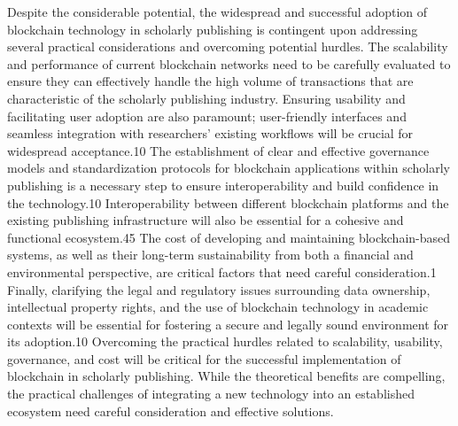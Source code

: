 Despite the considerable potential, the widespread and successful adoption of blockchain technology in scholarly publishing is contingent upon addressing several practical considerations and overcoming potential hurdles. The scalability and performance of current blockchain networks need to be carefully evaluated to ensure they can effectively handle the high volume of transactions that are characteristic of the scholarly publishing industry. Ensuring usability and facilitating user adoption are also paramount; user-friendly interfaces and seamless integration with researchers' existing workflows will be crucial for widespread acceptance.10 The establishment of clear and effective governance models and standardization protocols for blockchain applications within scholarly publishing is a necessary step to ensure interoperability and build confidence in the technology.10 Interoperability between different blockchain platforms and the existing publishing infrastructure will also be essential for a cohesive and functional ecosystem.45 The cost of developing and maintaining blockchain-based systems, as well as their long-term sustainability from both a financial and environmental perspective, are critical factors that need careful consideration.1 Finally, clarifying the legal and regulatory issues surrounding data ownership, intellectual property rights, and the use of blockchain technology in academic contexts will be essential for fostering a secure and legally sound environment for its adoption.10 Overcoming the practical hurdles related to scalability, usability, governance, and cost will be critical for the successful implementation of blockchain in scholarly publishing. While the theoretical benefits are compelling, the practical challenges of integrating a new technology into an established ecosystem need careful consideration and effective solutions.
